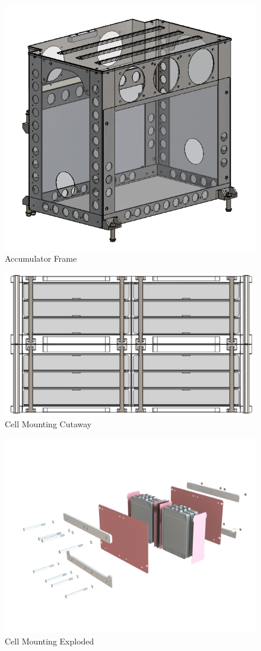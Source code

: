 \documentclass{article}
\begin{document}
            \begin{figure}[H]
                \centering
                \includegraphics[width = 0.5 \textwidth]{accumulator_frame}
                \caption{Accumulator Frame}
                \label{accframe}
            \end{figure}

            \begin{figure}[H]
                \centering
                \includegraphics[width = 0.5 \textwidth]{cellmount_cutaway}
                \caption{Cell Mounting Cutaway}
                \label{cellcut}
            \end{figure}

            \begin{figure}[H]
                \centering
                \includegraphics[width = 0.5 \textwidth]{cellmount_exploded}
                \caption{Cell Mounting Exploded}
                \label{cellexp}
            \end{figure}
\end{document}
